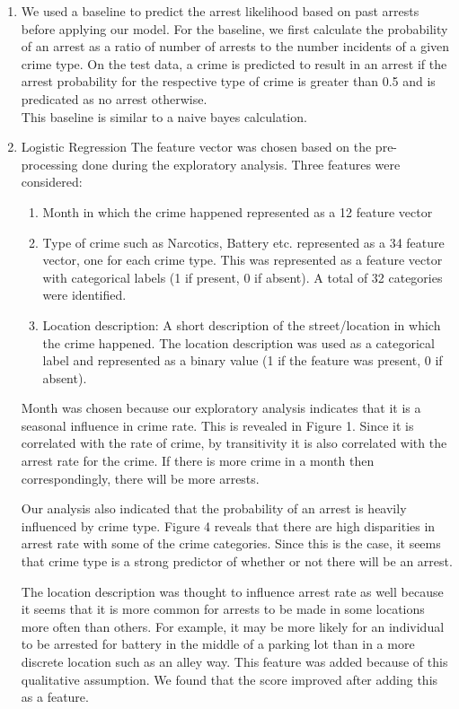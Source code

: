 \documentclass[journal]{IEEEtran}
\begin{document}
\begin{enumerate}
\item 
We used a baseline to predict the arrest likelihood based on past arrests before applying our model. For the baseline, we first calculate the probability of an arrest as a ratio of number of arrests to the number incidents of a given crime type. On the test data, a crime is predicted to result in an arrest if the arrest probability for the respective type of crime is greater than 0.5 and is predicated as no arrest otherwise.\\ This baseline is similar to a naive bayes calculation. 

\item Logistic Regression
 The feature vector was chosen based on the pre-processing done during the exploratory analysis. Three features were considered:
\begin{enumerate}
\item Month in  which the crime happened represented as a 12 feature vector
\item Type of crime such as Narcotics, Battery etc. represented as a 34 feature vector, one for each crime type.  This was represented as a feature vector with categorical labels (1 if present, 0 if absent).  A total of 32 categories were identified.
\item Location description: A short description of the street/location in which the crime happened.  The location description was used as a categorical label and represented as a binary value (1 if the feature was present, 0 if absent).
\end{enumerate}

Month was chosen because our exploratory analysis indicates that it is a seasonal influence in crime rate. This is revealed in Figure 1. Since it is correlated with the rate of crime, by transitivity it is also correlated with the arrest rate for the crime. If there is more crime in a month then correspondingly, there will be more arrests. 

Our analysis also indicated that the probability of an arrest is heavily influenced by crime type. Figure 4 reveals that there are high disparities in arrest rate with some of the crime categories. Since this is the case, it seems that crime type is a strong predictor of whether or not there will be an arrest. 

The location description was thought to influence arrest rate as well because it seems that it is more common for arrests to be made in some locations more often than others. For example, it may be more likely for an individual to be arrested for battery in the middle of a parking lot than in a more discrete location such as an alley way. This feature was added because of this qualitative assumption. We found that the score improved after adding this as a feature.


\end{enumerate}
\end{document}
